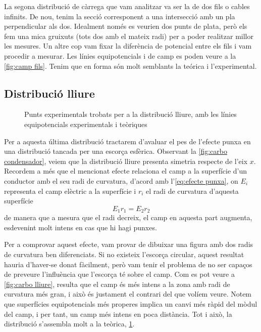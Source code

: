La segona distribució de càrrega que vam analitzar va ser la de dos fils o cables infinits. De nou, tenim la secció corresponent a una intersecció amb un pla perpendicular als dos. Idealment només es veurien dos punts de plata, però els fem una mica gruixuts (tots dos amb el mateix radi) per a poder realitzar millor les mesures. Un altre cop vam fixar la diferència de potencial entre els fils i vam procedir a mesurar. Les línies equipotencials i de camp es poden veure a la \cref{fig:camp fils}. Tenim que en forma són molt semblants la teórica i l'experimental.

\subsection{Distribució lliure}
\begin{figure}[htb]
  \centering \small \sffamily
	
  \caption{Punts experimentals trobats per a la distribució lliure, amb les línies equipotencials experimentals i teòriques}
  \label{fig:camp lliure}
\end{figure}

Per a aquesta última distribució tractarem d'avaluar el pes de l'efecte punxa en una distribució tancada per una escorça esfèrica. Observant la \cref{fig:carbo condensador}, veiem que la distribució lliure presenta simetria respecte de l'eix $x$. Recordem a més que el mencionat efecte relaciona el camp a la superfície d'un conductor amb el seu radi de curvatura, d'acord amb l'\cref{eq:efecte punxa}, on $E_i$ representa el camp elèctric a la superfície i $r_i$ el radi de curvatura d'aquesta superfície
\begin{equation} \label{eq:efecte punxa}
	E_1r_1=E_2r_2
\end{equation}
de manera que a mesura que el radi decreix, el camp en aquesta part augmenta, esdevenint molt intens en cas que hi hagi punxes.

Per a comprovar aquest efecte, vam provar de dibuixar una figura amb dos radis de curvatura ben diferenciats. Si no existeix l'escorça circular, aquest resultat hauria d'haver-se donat fàcilment, però vam tenir el problema de no ser capaços de preveure l'influència que l'escorça té sobre el camp. Com es pot veure a \cref{fig:carbo lliure}, resulta que el camp és més intens a la zona amb radi de curvatura més gran, i això és justament el contrari del que volíem veure. Notem que superfícies equipotencials més properes implica un canvi més ràpid del mòdul del camp, i per tant, un camp més intens en poca distància. Tot i això, la distribució s'assembla molt a la teòrica, \cref{fig:camp lliure}.

